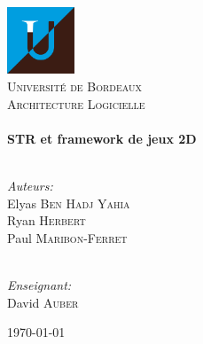 \begin{titlepage}
\begin{center}

\includegraphics[width=0.15\textwidth]{./resources/ub.png}~\\[1cm]

\textsc{\LARGE Université de Bordeaux}\\[1.5cm]

\textsc{\Large {Architecture Logicielle}}\\[0.5cm]

\HRule \\[0.5cm]
{ \huge \bfseries STR et framework de jeux 2D}\\[0.2cm]
\HRule \\[1.5cm]

\begin{minipage}{0.4\textwidth}
\begin{flushleft} \large
\emph{Auteurs:} \\
Elyas \textsc{Ben Hadj Yahia}\\
Ryan \textsc{Herbert}\\
Paul \textsc{Maribon-Ferret}\\
\end{flushleft}
\end{minipage}
\begin{minipage}{0.4\textwidth}
\begin{flushright} \large
\emph{\\Enseignant:} \\
David \textsc{Auber}
\end{flushright}
\end{minipage}

\vfill

{\large \today}

\end{center}
\end{titlepage}
